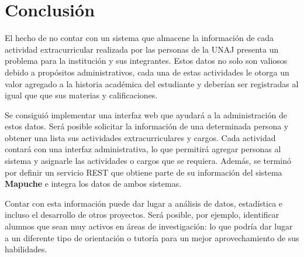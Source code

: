 
\section{Conclusión}
\label{sec:conclusion}
El hecho de no contar con un sistema que almacene la información de cada
actividad extracurricular realizada por las personas de la UNAJ presenta
un problema para la institución y sus integrantes\@. Estos datos
no solo son valiosos debido a propósitos administrativos, cada una de
estas actividades le otorga un valor agregado a la historia académica del
estudiante y deberían ser registradas al igual que que sus
materias y calificaciones.


Se consiguió implementar una interfaz web que ayudará a la administración
de estos datos. Será posible solicitar la información de una determinada
persona y obtener una lista sus actividades extracurriculares y cargos\@.
Cada actividad contará con una interfaz administrativa, lo que
permitirá agregar personas al sistema y asignarle las actividades o cargos
que se requiera\@. Además, se terminó por definir un servicio REST que
obtiene parte de su información del sistema \textbf{Mapuche} e integra
los datos de ambos sistemas.



Contar con esta información puede dar lugar a análisis de datos,
estadística e incluso el desarrollo de otros proyectos. Será posible,
por ejemplo, identificar alumnos que sean muy activos en áreas de
investigación: lo que podría dar lugar a un diferente tipo de orientación
o tutoría para un mejor aprovechamiento de sus habilidades\@.


